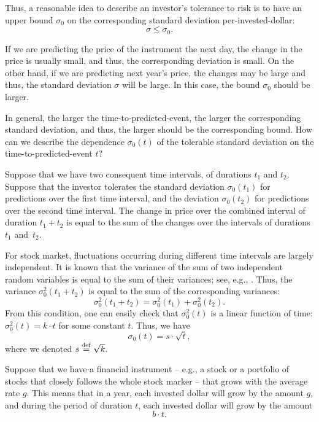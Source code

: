 \documentclass{article}
\begin{document}
Thus, a reasonable idea to describe an investor's tolerance to risk
is to have an upper bound $\sigma_0$ on the corresponding standard
deviation per-invested-dollar: $$\sigma\le \sigma_0.$$
\medskip

 If we are predicting the price of the instrument
the next day, the change in the price is usually small, and thus,
the corresponding deviation is small. On the other hand, if we are
predicting next year's price, the changes may be large and thus,
the standard deviation $\sigma$ will be large. In this case, the
bound $\sigma_0$ should be larger.

In general, the larger the time-to-predicted-event, the larger the
corresponding standard deviation, and thus, the larger should be
the corresponding bound. How can we describe the dependence
$\sigma_0(t)$ of the tolerable standard deviation on the
time-to-predicted-event $t$?

Suppose that we have two consequent time intervals, of durations
$t_1$ and $t_2$. Suppose that the investor tolerates the standard
deviation $\sigma_0(t_1)$ for predictions over the first time
interval, and the deviation $\sigma_0(t_2)$ for predictions over
the second time interval. The change in price over the combined
interval of duration $t_1+t_2$ is equal to the sum of the changes
over the intervals of durations $t_1$ and~$t_2$.

For stock market, fluctuations occurring during different time
intervals are largely independent. It is known that the variance of
the sum of two independent random variables is equal to the sum of
their variances; see, e.g., \cite{Sheskin 2011}. Thus, the variance
$\sigma_0^2(t_1+t_2)$ is equal to the sum of the corresponding
variances: $$\sigma_0^2(t_1+t_2)=\sigma_0^2(t_1)+\sigma_0^2(t_2).$$
From this condition, one can easily check that $\sigma_0^2(t)$ is a
linear function of time: $\sigma_0^2(t)=k\cdot t$ for some constant
$t$. Thus, we have $$\sigma_0(t)=s\cdot \sqrt{t},$$ where we
denoted $s\stackrel{\rm def}{=}\sqrt{k}.$
\medskip

Suppose that we have a financial instrument -- e.g., a stock or a
portfolio of stocks that closely follows the whole stock marker --
that grows with the average rate $g$. This means that in a year, each
invested dollar will grow by the amount $g$, and during the period
of duration $t$, each invested dollar will grow by the amount
$$b\cdot t.$$
\end{document}

